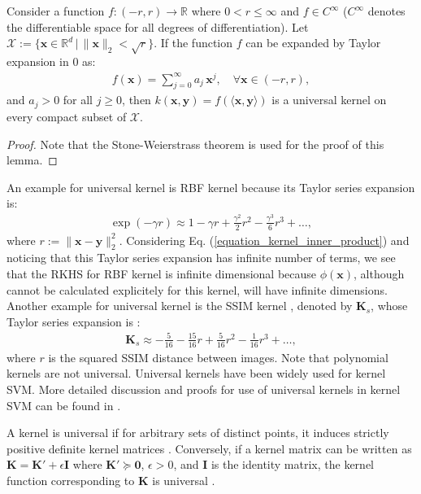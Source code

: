 \documentclass[lang=cn,10pt]{gorgeousnbook}
\numberwithin{equation}{section}%
\numberwithin{figure}{section}%
\begin{document}
\begin{lemma}
Consider a function $f : (-r, r) \rightarrow \mathbb{R}$ where $0 < r \leq \infty$ and $f \in C^\infty$ ($C^\infty$ denotes the differentiable space for all degrees of differentiation). Let $\mathcal{X} := \{\boldsymbol{x} \in \mathbb{R}^d\, |\, \|\boldsymbol{x}\|_2 < \sqrt{r}\}$. If the function $f$ can be expanded by Taylor expansion in $0$ as:
\begin{align}
f(\boldsymbol{x}) = \sum_{j=0}^\infty a_j\, \boldsymbol{x}^j, \quad \forall \boldsymbol{x} \in (-r, r),
\end{align}
and $a_j > 0$ for all $j \geq 0$, then $k(\boldsymbol{x}, \boldsymbol{y}) = f(\langle \boldsymbol{x}, \boldsymbol{y} \rangle)$ is a universal kernel on every compact subset of $\mathcal{X}$. 
\end{lemma}
\begin{proof}
Note that the Stone-Weierstrass theorem \cite{de1959stone} is used for the proof of this lemma.
\end{proof}
An example for universal kernel is RBF kernel because its Taylor series expansion is:
\begin{align*}
\exp(-\gamma r) \approx 1 - \gamma r + \frac{\gamma^2}{2} r^2 - \frac{\gamma^3}{6} r^3 + \dots,
\end{align*}
where $r := \|\boldsymbol{x} - \boldsymbol{y}\|_2^2$.
Considering Eq. (\ref{equation_kernel_inner_product}) and noticing that this Taylor series expansion has infinite number of terms, we see that the RKHS for RBF kernel is infinite dimensional because $\phi(\boldsymbol{x})$, although cannot be calculated explicitely for this kernel, will have infinite dimensions. 
Another example for universal kernel is the SSIM kernel \cite{ghojogh2020theoretical}, denoted by $\boldsymbol{K}_s$, whose Taylor series expansion is \cite{ghojogh2019image}:
\begin{align*}
\boldsymbol{K}_s \approx -\frac{5}{16} - \frac{15}{16} r + \frac{5}{16} r^2 - \frac{1}{16} r^3 + \dots,
\end{align*}
where $r$ is the squared SSIM distance \cite{brunet2011mathematical} between images. 
Note that polynomial kernels are not universal. %
Universal kernels have been widely used for kernel SVM. 
More detailed discussion and proofs for use of universal kernels in kernel SVM can be found in \cite{steinwart2008support}.


\begin{lemma}
A kernel is universal if for arbitrary sets of distinct points, it induces strictly positive definite kernel matrices \cite{borgwardt2006integrating,song2008learning}. Conversely, if a kernel matrix can be written as $\boldsymbol{K} = \boldsymbol{K}' + \epsilon \boldsymbol{I}$ where $\boldsymbol{K}' \succeq \boldsymbol{0}$, $\epsilon > 0$, and $\boldsymbol{I}$ is the identity matrix, the kernel function corresponding to $\boldsymbol{K}$ is universal \cite{pan2008transfer}.
\end{lemma}
\end{document}
